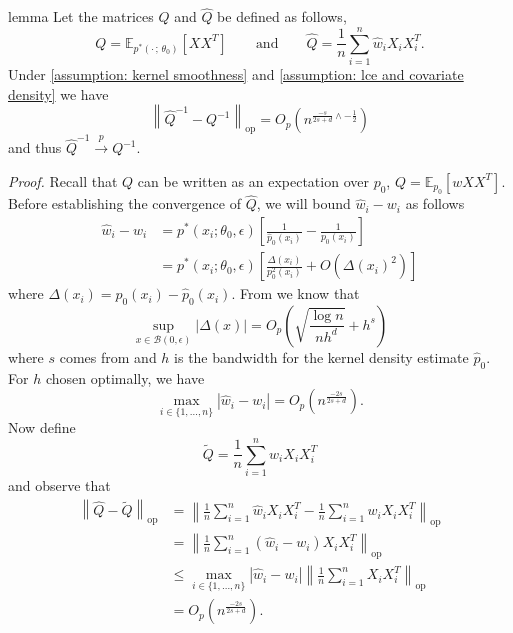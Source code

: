 \documentclass[11pt]{article}
\begin{document}
\begin{restatable}{lemma}{}
    Let the matrices $Q$ and $\hat{Q}$ be defined as follows, 
    \begin{equation}
    Q = \mathbb{E}_{p^*(\cdot\,;\, \theta_0)}\left[XX^T\right] \qquad \text{and} \qquad \hat{Q} = \frac{1}{n}\sum_{i = 1}^n\hat{w}_iX_iX_i^T.
    \end{equation}
    Under \cref{assumption: kernel smoothness} and \cref{assumption: lce and covariate density} we have 
    \[\left\|\hat{Q}^{-1} - Q^{-1}\right\|_{\text{op}} = O_p\left(n^{\frac{-s}{2s+d} \wedge -\frac{1}{2}}\right)\]
    and thus $\hat{Q}^{-1}\overset{p}{\rightarrow}Q^{-1}$. \label{lemma: Q convergence}
\end{restatable}
\noindent \textit{Proof.} Recall that $Q$ can be written as an expectation over $p_0$, $Q = \mathbb{E}_{p_0}\left[wXX^T\right]$. Before establishing the convergence of $\hat{Q}$, we will bound $\hat{w}_i - w_i$ as follows
\begin{align*}
    \hat{w}_i - w_i &= p^*(x_i; \theta_0, \epsilon) \left[\frac{1}{\hat{p}_0(x_i)} - \frac{1}{p_0(x_i)}\right] \\
    &= p^*(x_i; \theta_0, \epsilon) \left[\frac{\Delta(x_i)}{p^2_0(x_i)} + O(\Delta(x_i)^2)\right]
\end{align*}
where $\Delta(x_i) = p_0(x_i) - \hat{p}_0(x_i)$. From \citet{hansen2008uniform} we know that 
\begin{equation}
    \sup_{x \in \mathcal{B}(0, \epsilon)} |\Delta(x)| = O_p\left(\sqrt{\frac{\log n}{nh^d}} + h^s\right)
\end{equation}
where $s$ comes from  and $h$ is the bandwidth for the kernel density estimate $\hat{p}_0$. For $h$ chosen optimally, we have
\begin{equation}
    \max_{i \in \{1, \dots, n \}} |\hat{w}_i - w_i| = O_p\left(n^{\frac{-2s}{2s+d}}\right).
\end{equation}
Now define 
\[\tilde{Q} = \frac{1}{n}\sum_{i = 1}^n w_iX_iX_i^T\]
and observe that 
\begin{align}
\left\|\hat{Q} - \tilde{Q}\right\|_{\text{op}} &= \left\|\frac{1}{n}\sum_{i = 1}^n\hat{w}_iX_iX_i^T - \frac{1}{n}\sum_{i = 1}^nw_iX_iX_i^T\right\|_{\text{op}} \\
&= \left\|\frac{1}{n}\sum_{i = 1}^n(\hat{w}_i - w_i)X_iX_i^T\right\|_{\text{op}} \\
&\leq \max_{i \in \{1, \dots, n\}}|\hat{w}_i - w_i| \left\|\frac{1}{n}\sum_{i = 1}^nX_iX_i^T\right\|_{\text{op}} \\
&= O_p\left(n^{\frac{-2s}{2s+d}}\right).
\end{align}
\end{document}
